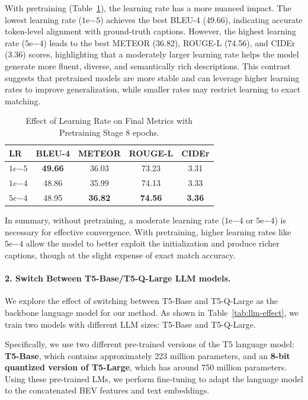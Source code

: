 \documentclass{article} %
\begin{document}
With pretraining (Table~\ref{tab:lr_effectwpretrain}), the learning rate has a more nuanced impact. The lowest learning rate ($1\text{e}{-5}$) achieves the best BLEU-4 (49.66), indicating accurate token-level alignment with ground-truth captions. However, the highest learning rate ($5\text{e}{-4}$) leads to the best METEOR (36.82), ROUGE-L (74.56), and CIDEr (3.36) scores, highlighting that a moderately larger learning rate helps the model generate more fluent, diverse, and semantically rich descriptions. This contrast suggests that pretrained models are more stable and can leverage higher learning rates to improve generalization, while smaller rates may restrict learning to exact matching.

\begin{table}[H]
	\centering
	\small
	\begin{tabular}{lcccc}
		\toprule
		\textbf{LR} & \textbf{BLEU-4} & \textbf{METEOR} & \textbf{ROUGE-L} & \textbf{CIDEr} \\
		\midrule
		$1e{-5}$   & \textbf{49.66} & 36.03 & 73.23 & 3.31 \\
		$1e{-4}$   & 48.86 & 35.99 & 74.13 & 3.33 \\
		$5e{-4}$   & 48.95 & \textbf{36.82} & \textbf{74.56} & \textbf{3.36} \\
		\bottomrule
	\end{tabular}
	\caption{Effect of Learning Rate on Final Metrics with Pretraining Stage 8 epochs.}
	\label{tab:lr_effectwpretrain}
\end{table}

In summary, without pretraining, a moderate learning rate ($1\text{e}{-4}$ or $5\text{e}{-4}$) is necessary for effective convergence. With pretraining, higher learning rates like $5\text{e}{-4}$ allow the model to better exploit the initialization and produce richer captions, though at the slight expense of exact match accuracy.


\paragraph{2. Switch Between T5-Base/T5-Q-Large LLM models.}

We explore the effect of switching between T5-Base and T5-Q-Large as the backbone language model for our method. As shown in Table~\ref{tab:llm-effect}, we train two models with different LLM sizes: T5-Base and T5-Q-Large.

Specifically, we use two different pre-trained versions of the T5 language model: \textbf{T5-Base}, which contains approximately 223 million parameters, and an \textbf{8-bit quantized version of T5-Large}, which has around 750 million parameters. Using these pre-trained LMs, we perform fine-tuning to adapt the language model to the concatenated BEV features and text embeddings.
\end{document}
